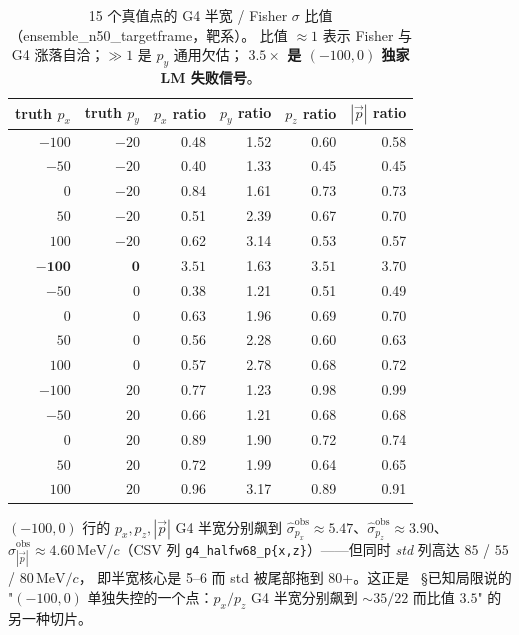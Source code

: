 \begin{table}[ht]
  \centering\small
  \caption{15 个真值点的 G4 半宽 / Fisher $\sigma$ 比值（ensemble\_n50\_targetframe，靶系）。
    比值 $\approx 1$ 表示 Fisher 与 G4 涨落自洽；$\gg 1$ 是 $p_y$ 通用欠估；
    \textbf{$3.5\times$ 是 $(-100, 0)$ 独家 LM 失败信号}。}
  \label{tab:partIIc:lm:g4-vs-fisher}
  \begin{tabular}{rr|rrrr}
    \hline
    truth $p_x$ & truth $p_y$ & $p_x$ ratio & $p_y$ ratio & $p_z$ ratio & $|\vec p|$ ratio \\
    \hline
    $-100$ & $-20$ & 0.48 & 1.52 & 0.60 & 0.58 \\
    $-50$  & $-20$ & 0.40 & 1.33 & 0.45 & 0.45 \\
    $0$    & $-20$ & 0.84 & 1.61 & 0.73 & 0.73 \\
    $50$   & $-20$ & 0.51 & 2.39 & 0.67 & 0.70 \\
    $100$  & $-20$ & 0.62 & 3.14 & 0.53 & 0.57 \\
    \hline
    $\mathbf{-100}$ & $\mathbf{0}$  & $\mathbf{3.51}$ & 1.63 & $\mathbf{3.51}$ & $\mathbf{3.70}$ \\
    $-50$  & $0$  & 0.38 & 1.21 & 0.51 & 0.49 \\
    $0$    & $0$  & 0.63 & 1.96 & 0.69 & 0.70 \\
    $50$   & $0$  & 0.56 & 2.28 & 0.60 & 0.63 \\
    $100$  & $0$  & 0.57 & 2.78 & 0.68 & 0.72 \\
    \hline
    $-100$ & $20$  & 0.77 & 1.23 & 0.98 & 0.99 \\
    $-50$  & $20$  & 0.66 & 1.21 & 0.68 & 0.68 \\
    $0$    & $20$  & 0.89 & 1.90 & 0.72 & 0.74 \\
    $50$   & $20$  & 0.72 & 1.99 & 0.64 & 0.65 \\
    $100$  & $20$  & 0.96 & 3.17 & 0.89 & 0.91 \\
    \hline
  \end{tabular}
\end{table}

$(-100, 0)$ 行的 $p_x, p_z, |\vec p|$ G4 半宽分别飙到
$\widehat\sigma^\mathrm{obs}_{p_x}\approx 5.47$、$\widehat\sigma^\mathrm{obs}_{p_z}\approx 3.90$、
$\widehat\sigma^\mathrm{obs}_{|\vec p|}\approx 4.60\,\mathrm{MeV}/c$（CSV 列
\texttt{g4\_halfw68\_p\{x,z\}}）——但同时 \emph{std} 列高达 $85$ / $55$ / $80\,\mathrm{MeV}/c$，
即半宽核心是 5--6 而 std 被尾部拖到 80+。这正是 \StatusReport{}~§已知局限说的
"$(-100, 0)$ 单独失控的一个点：$p_x/p_z$ G4 半宽分别飙到 $\sim 35/22$ 而比值 $3.5$"
的另一种切片。


